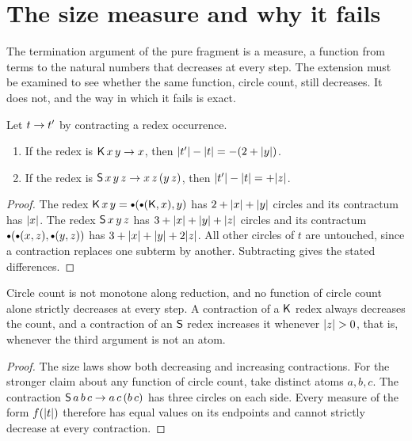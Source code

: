 \section{The size measure and why it fails}\label{sec:size}

The termination argument of the pure fragment is a measure, a function from terms to the natural numbers that decreases at every step. The extension must be examined to see whether the same function, circle count, still decreases. It does not, and the way in which it fails is exact.

\begin{proposition}\label{prop:sizelaw}
Let $t\rightarrow t'$ by contracting a redex occurrence.
\begin{enumerate}[label=(\roman*)]
\item If the redex is $\mathsf{K}\,x\,y\rightarrow x$, then $\lvert t'\rvert-\lvert t\rvert=-(2+\lvert y\rvert)$.
\item If the redex is $\mathsf{S}\,x\,y\,z\rightarrow x\,z\,(y\,z)$, then $\lvert t'\rvert-\lvert t\rvert=+\lvert z\rvert$.
\end{enumerate}
\end{proposition}

\begin{proof}
The redex $\Kc\,x\,y=\App(\App(\Kc,x),y)$ has $2+\lvert x\rvert+\lvert y\rvert$ circles and its contractum has $\lvert x\rvert$. The redex $\mathsf{S}\,x\,y\,z$ has $3+\lvert x\rvert+\lvert y\rvert+\lvert z\rvert$ circles and its contractum $\App(\App(x,z),\App(y,z))$ has $3+\lvert x\rvert+\lvert y\rvert+2\lvert z\rvert$. All other circles of $t$ are untouched, since a contraction replaces one subterm by another. Subtracting gives the stated differences.
\end{proof}

\begin{corollary}\label{cor:nomeasure}
Circle count is not monotone along reduction, and no function of circle count alone strictly decreases at every step. A contraction of a $\mathsf{K}$ redex always decreases the count, and a contraction of an $\mathsf{S}$ redex increases it whenever $\lvert z\rvert>0$, that is, whenever the third argument is not an atom.
\end{corollary}

\begin{proof}
The size laws show both decreasing and increasing contractions. For the stronger claim about any function of circle count, take distinct atoms $a,b,c$. The contraction $\mathsf{S}\,a\,b\,c\rightarrow a\,c\,(b\,c)$ has three circles on each side. Every measure of the form $f(\lvert t\rvert)$ therefore has equal values on its endpoints and cannot strictly decrease at every contraction.
\end{proof}

